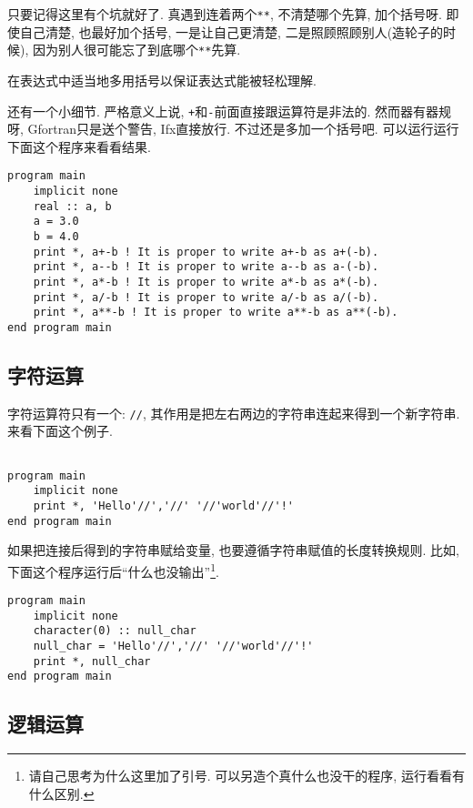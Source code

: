 只要记得这里有个坑就好了. 真遇到连着两个\texttt{**}, 不清楚哪个先算, 加个括号呀. 即使自己清楚, 也最好加个括号, 一是让自己更清楚, 二是照顾照顾别人(造轮子的时候), 因为别人很可能忘了到底哪个\texttt{**}先算.

\begin{convention}\label{use_barket}
    在表达式中适当地多用括号以保证表达式能被轻松理解.
\end{convention}

还有一个小细节. 严格意义上说, \texttt{+}和\texttt{-}前面直接跟运算符是非法的. 然而器有器规呀, Gfortran只是送个警告, Ifx直接放行. 不过还是多加一个括号吧. 可以运行运行下面这个程序来看看结果.
\begin{lstlisting}
program main
    implicit none
    real :: a, b
    a = 3.0
    b = 4.0
    print *, a+-b ! It is proper to write a+-b as a+(-b).
    print *, a--b ! It is proper to write a--b as a-(-b).
    print *, a*-b ! It is proper to write a*-b as a*(-b).
    print *, a/-b ! It is proper to write a/-b as a/(-b).
    print *, a**-b ! It is proper to write a**-b as a**(-b).
end program main
\end{lstlisting}

\subsection{字符运算}

字符运算符只有一个: \texttt{//}, 其作用是把左右两边的字符串连起来得到一个新字符串. 来看下面这个例子.
\begin{lstlisting}

program main
    implicit none
    print *, 'Hello'//','//' '//'world'//'!'
end program main
\end{lstlisting}

如果把连接后得到的字符串赋给变量, 也要遵循字符串赋值的长度转换规则. 比如, 下面这个程序运行后``什么也没输出''\footnote{
    请自己思考为什么这里加了引号. 可以另造个真什么也没干的程序, 运行看看有什么区别.
}.
\begin{lstlisting}
program main
    implicit none
    character(0) :: null_char
    null_char = 'Hello'//','//' '//'world'//'!'
    print *, null_char
end program main
\end{lstlisting}

\subsection{逻辑运算}

